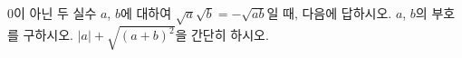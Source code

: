 0이 아닌 두 실수 $a$, $b$에 대하여 $\sqrt{a}\sqrt{b}=-\sqrt{ab}$일 때, 다음에 답하시오.
 $a$, $b$의 부호를 구하시오.
 $|a|+\sqrt{(a+b)^2}$을 간단히 하시오.
